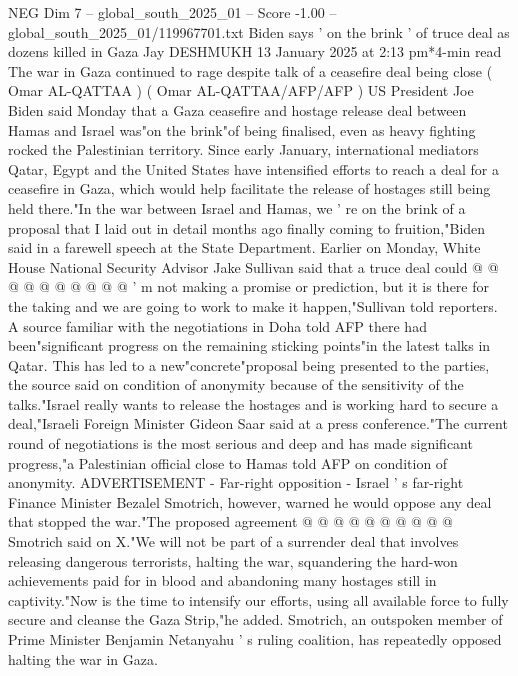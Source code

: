 \begin{textsample}{NEG Dim 7 – global\_south\_2025\_01 – Score -1.00 – global\_south\_2025\_01/119967701.txt}  \label{ex:f7_neg_114}
Biden says ' on the brink ' of truce deal as dozens killed in Gaza Jay DESHMUKH 13 January 2025 at 2:13 pm*4-min read The war in Gaza continued to rage despite talk of a ceasefire deal being close ( Omar AL-QATTAA ) ( Omar AL-QATTAA/AFP/AFP ) US President Joe Biden said Monday that a Gaza ceasefire and hostage release deal between Hamas and Israel was"on the brink"of being finalised, even as heavy fighting rocked the Palestinian territory.
Since early January, international mediators Qatar, Egypt and the United States have intensified efforts to reach a deal for a ceasefire in Gaza, which would help facilitate the release of hostages still being held there."In the war between Israel and Hamas, we ' re on the brink of a proposal that I laid out in detail months ago finally coming to fruition,"Biden said in a farewell speech at the State Department.
Earlier on Monday, White House National Security Advisor Jake Sullivan said that a truce deal could @ @ @ @ @ @ @ @ @ @ ' m not making a promise or prediction, but it is there for the taking and we are going to work to make it happen,"Sullivan told reporters.
A source familiar with the negotiations in Doha told AFP there had been"significant progress on the remaining sticking points"in the latest talks in Qatar.
This has led to a new"concrete"proposal being presented to the parties, the source said on condition of anonymity because of the sensitivity of the talks."Israel really wants to release the hostages and is working hard to secure a deal,"Israeli Foreign Minister Gideon Saar said at a press conference."The current round of negotiations is the most serious and deep and has made significant progress,"a Palestinian official close to Hamas told AFP on condition of anonymity.
ADVERTISEMENT - Far-right opposition - Israel ' s far-right Finance Minister Bezalel Smotrich, however, warned he would oppose any deal that stopped the war."The proposed agreement @ @ @ @ @ @ @ @ @ @ Smotrich said on X."We will not be part of a surrender deal that involves releasing dangerous terrorists, halting the war, squandering the hard-won achievements paid for in blood and abandoning many hostages still in captivity."Now is the time to intensify our efforts, using all available force to fully secure and cleanse the Gaza Strip,"he added.
Smotrich, an outspoken member of Prime Minister Benjamin Netanyahu ' s ruling coalition, has repeatedly opposed halting the war in Gaza.

\end{textsample}
